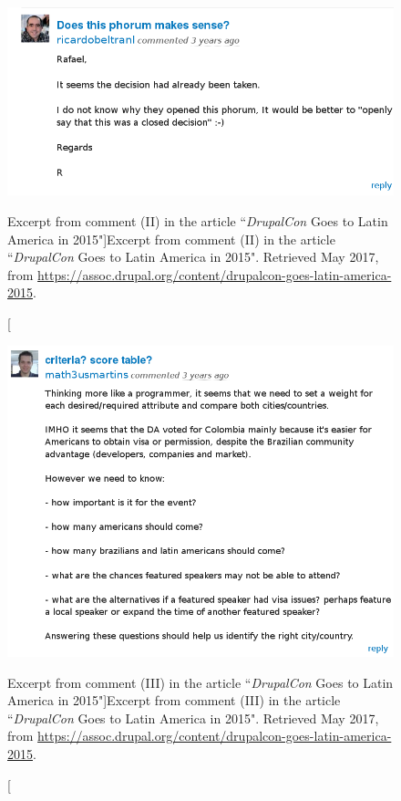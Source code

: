 \begin{figure}[H]
  \centering
\includegraphics[scale=0.45]{img/quotes_replacement/dcon_la_2015_03.png}
\caption[Excerpt from comment (II) in the article ``\textit{DrupalCon} Goes to Latin America in 2015"]{Excerpt from comment (II) in the article ``\textit{DrupalCon} Goes to Latin America in 2015". Retrieved  May 2017, from \url{https://assoc.drupal.org/content/drupalcon-goes-latin-america-2015}.}
\label{quote_da_dcon_la_announcement_c2}
\end{figure}

\begin{figure}[H]
  \centering
\includegraphics[scale=0.45]{img/quotes_replacement/dcon_la_2015_04.png}
\caption[Excerpt from comment (III) in the article ``\textit{DrupalCon} Goes to Latin America in 2015"]{Excerpt from comment (III) in the article ``\textit{DrupalCon} Goes to Latin America in 2015". Retrieved  May 2017, from \url{https://assoc.drupal.org/content/drupalcon-goes-latin-america-2015}.}
\label{quote_da_dcon_la_announcement_c3}
\end{figure}

